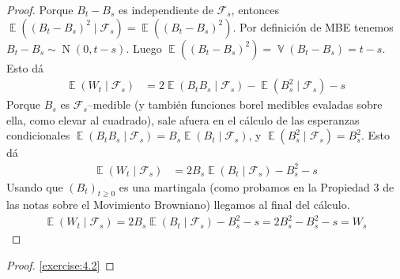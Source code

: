 \documentclass{article}
\DeclareMathOperator{\Expectation}{\mathbb{E}}
\DeclareMathOperator{\Variance}{\mathbb{V}}
\DeclareMathOperator{\normal}{N}
\newcommand{\brownian}{B}
\newcommand{\wiener}{W}
\newcommand{\events}{\mathcal{F}}
\theoremstyle{definition}
\begin{document}
\begin{proof}
Porque \(\brownian_t - \brownian_s\) es independiente de \(\events_s\), entonces \(\Expectation \left( (\brownian_t - \brownian_s)^2 \mid \events_s \right) = \Expectation \left( (\brownian_t - \brownian_s)^2\right)\).
Por definición de MBE tenemos \(\brownian_t - \brownian_s \sim \normal(0, t - s)\).
Luego \(\Expectation \left( (\brownian_t - \brownian_s)^2\right) = \Variance(\brownian_t - \brownian_s)= t - s\).
Esto dá
\begin{align}
	\Expectation(\wiener_t \mid \events_s)
	&= 
	2 \Expectation \left( \brownian_t \brownian_s \mid \events_s \right) 
	- \Expectation \left( \brownian_s^2 \mid \events_s \right) 
	- s
\end{align}
Porque \(B_s\) es \(\events_s\)--medible (y también funciones borel medibles evaladas sobre ella, como elevar al cuadrado), sale afuera en el cálculo de las esperanzas condicionales \(\Expectation \left( \brownian_t \brownian_s \mid \events_s \right) = \brownian_s \Expectation \left( \brownian_t \mid \events_s \right)\), y \(\Expectation \left( \brownian_s^2 \mid \events_s \right) = \brownian_s^2\).
Esto dá
\begin{align}
	\Expectation(\wiener_t \mid \events_s)
	&= 
	2 \brownian_s \Expectation \left( \brownian_t \mid \events_s \right) 
	- \brownian_s^2 
	- s
\end{align}
Usando que \((\brownian_t)_{t \geq 0}\) es una martingala (como probamos en la Propiedad 3 de las notas sobre el Movimiento Browniano) llegamos al final del cálculo.
\begin{align}
	\Expectation(\wiener_t \mid \events_s)
	= 
	2 \brownian_s \Expectation \left( \brownian_t \mid \events_s \right) 
	- \brownian_s^2 
	- s
	=
	2 \brownian_s^2 - \brownian_s^2 - s
	=
	\wiener_s
\end{align}
\end{proof}
\begin{proof} \ref{exercise:4.2}
\end{proof}
\end{document}
